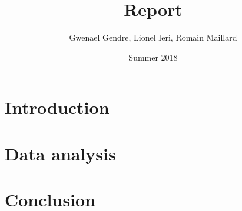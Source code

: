 \documentclass[12pt, a4paper, twoside]{report}
\title{Report}
\author{Gwenael Gendre, Lionel Ieri, Romain Maillard}
\date{Summer 2018}
\begin{document}
 
\begin{titlepage}
\maketitle
\end{titlepage}
\tableofcontents
\newpage

\section{Introduction}

\section{Data analysis}

\section{Conclusion}
 
\end{document}
